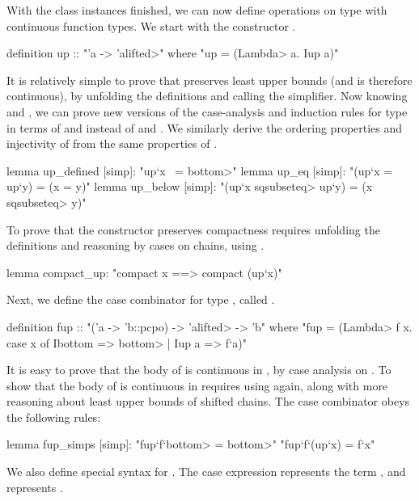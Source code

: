 With the class instances finished, we can now define operations on type  with continuous function types. We start with the constructor .
%
\begin{isacode}
definition up :: "'a -> 'a\<lifted>" where "up = (\<Lambda> a. Iup a)"
\end{isacode}
%
It is relatively simple to prove that  preserves least upper bounds (and is therefore continuous), by unfolding the definitions and calling the simplifier. Now knowing  and , we can prove new versions of the case-analysis and induction rules for type  in terms of  and  instead of  and . We similarly derive the ordering properties and injectivity of  from the same properties of .
%
\begin{isacodes}
lemma up_defined [simp]: "up`x ~= \<bottom>"
lemma up_eq [simp]: "(up`x = up`y) = (x = y)"
lemma up_below [simp]: "(up`x \<sqsubseteq> up`y) = (x \<sqsubseteq> y)"
\end{isacodes}
%
To prove that the  constructor preserves compactness requires unfolding the definitions and reasoning by cases on chains, using .
\begin{isacode}
lemma compact_up: "compact x ==> compact (up`x)"
\end{isacode}

\noindent
Next, we define the case combinator for type , called .
\begin{isacode}
definition fup :: "('a -> 'b::pcpo) -> 'a\<lifted> -> 'b"
  where "fup = (\<Lambda> f x. case x of Ibottom => \<bottom> | Iup a => f`a)"
\end{isacode}
It is easy to prove that the body of  is continuous in , by case analysis on . To show that the body of  is continuous in  requires using  again, along with more reasoning about least upper bounds of shifted chains. The case combinator obeys the following rules:
\begin{isacode}
lemma fup_simps [simp]:
  "fup`f`\<bottom> = \<bottom>"
  "fup`f`(up`x) = f`x"
\end{isacode}
We also define special syntax for . The case expression  represents the term , and  represents .

